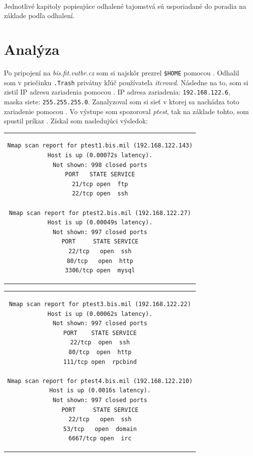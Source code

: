 \documentclass[11pt,a4paper]{article}
\begin{document}
\hfill\\

Jednotlivé kapitoly popisujúce odhalené tajomstvá sú usporiadané do poradia na základe podľa odhalení.

\section{Analýza}\label{sec:analysis}

Po pripojení na \textit{bis.fit.vutbr.cz} som si najskôr prezrel \texttt{\$HOME} pomocou . Odhalil som v priečinku \texttt{.Trash} privátny kľúč používateľa \textit{itcrowd}. Následne na to, som si zistil IP adresu zariadenia pomocou . IP adresa zariadenia: \texttt{192.168.122.6}, maska siete: \texttt{255.255.255.0}. Zanalyzoval som si sieť v ktorej sa nachádza toto zariadenie pomocou . Vo výstupe som spozoroval \textit{ptest}, tak na základe tohto, som spustil príkaz . Získal som nasledujúci výsledok:

\begin{center}
\begin{tabular}{c}
\begin{lstlisting}[basicstyle=\small]
Nmap scan report for ptest1.bis.mil (192.168.122.143)
Host is up (0.00072s latency).
Not shown: 998 closed ports
PORT   STATE SERVICE
21/tcp open  ftp
22/tcp open  ssh

Nmap scan report for ptest2.bis.mil (192.168.122.27)
Host is up (0.00049s latency).
Not shown: 997 closed ports
PORT     STATE SERVICE
22/tcp   open  ssh
80/tcp   open  http
3306/tcp open  mysql
\end{lstlisting}
\end{tabular}
\end{center}

\begin{center}
\begin{tabular}{c}
\begin{lstlisting}[basicstyle=\small]
Nmap scan report for ptest3.bis.mil (192.168.122.22)
Host is up (0.00062s latency).
Not shown: 997 closed ports
PORT    STATE SERVICE
22/tcp  open  ssh
80/tcp  open  http
111/tcp open  rpcbind

Nmap scan report for ptest4.bis.mil (192.168.122.210)
Host is up (0.0016s latency).
Not shown: 997 closed ports
PORT     STATE SERVICE
22/tcp   open  ssh
53/tcp   open  domain
6667/tcp open  irc
\end{lstlisting}
\end{tabular}
\end{center}
\end{document}
